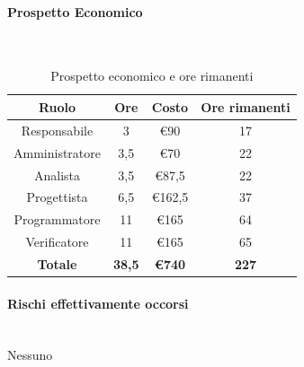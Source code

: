 \documentclass{article}
\begin{document}
                \paragraph{Prospetto Economico}\mbox{}\\
                \begin{table}[H]
                    \centering
                    \begin{tabular}{|c|c|c|c|}
                    \hline
                    \textbf{Ruolo}  & \textbf{Ore}  & \textbf{Costo} & \textbf{Ore rimanenti} \\ \hline
                    Responsabile    & 3             & €90            & 17                     \\ \hline
                    Amministratore  & 3,5           & €70            & 22                   \\ \hline
                    Analista        & 3,5           & €87,5          & 22                   \\ \hline
                    Progettista     & 6,5           & €162,5         & 37                   \\ \hline
                    Programmatore   & 11            & €165           & 64                     \\ \hline
                    Verificatore    & 11            & €165           & 65                     \\ \hline
                    \textbf{Totale} & \textbf{38,5} & \textbf{\euro740}   & \textbf{227}         \\ \hline
                    \end{tabular}
                    \caption{Prospetto economico e ore rimanenti}
                \end{table}


                \paragraph{Rischi effettivamente occorsi}\mbox{}\\
                Nessuno
\end{document}
